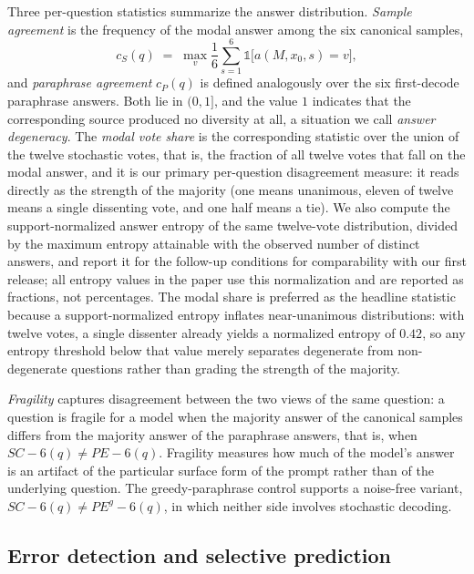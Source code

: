 \documentclass[preprint,12pt]{elsarticle}
\begin{document}
Three per-question statistics summarize the answer distribution. \emph{Sample agreement} is the frequency of the modal answer among the six canonical samples,
\begin{equation}
c_{S}(q) \;=\; \max_{v} \frac{1}{6} \sum_{s=1}^{6} \mathbb{1}\bigl[ a(M, x_0, s) = v \bigr],
\end{equation}
and \emph{paraphrase agreement} $c_{P}(q)$ is defined analogously over the six first-decode paraphrase answers. Both lie in $(0, 1]$, and the value $1$ indicates that the corresponding source produced no diversity at all, a situation we call \emph{answer degeneracy}. The \emph{modal vote share} is the corresponding statistic over the union of the twelve stochastic votes, that is, the fraction of all twelve votes that fall on the modal answer, and it is our primary per-question disagreement measure: it reads directly as the strength of the majority (one means unanimous, eleven of twelve means a single dissenting vote, and one half means a tie). We also compute the support-normalized answer entropy of the same twelve-vote distribution, divided by the maximum entropy attainable with the observed number of distinct answers, and report it for the follow-up conditions for comparability with our first release; all entropy values in the paper use this normalization and are reported as fractions, not percentages. The modal share is preferred as the headline statistic because a support-normalized entropy inflates near-unanimous distributions: with twelve votes, a single dissenter already yields a normalized entropy of $0.42$, so any entropy threshold below that value merely separates degenerate from non-degenerate questions rather than grading the strength of the majority.

\emph{Fragility} captures disagreement between the two views of the same question: a question is fragile for a model when the majority answer of the canonical samples differs from the majority answer of the paraphrase answers, that is, when $SC-6(q) \ne PE-6(q)$. Fragility measures how much of the model's answer is an artifact of the particular surface form of the prompt rather than of the underlying question. The greedy-paraphrase control supports a noise-free variant, $SC-6(q) \ne PE^{g}-6(q)$, in which neither side involves stochastic decoding.

\subsection{Error detection and selective prediction}
\end{document}
